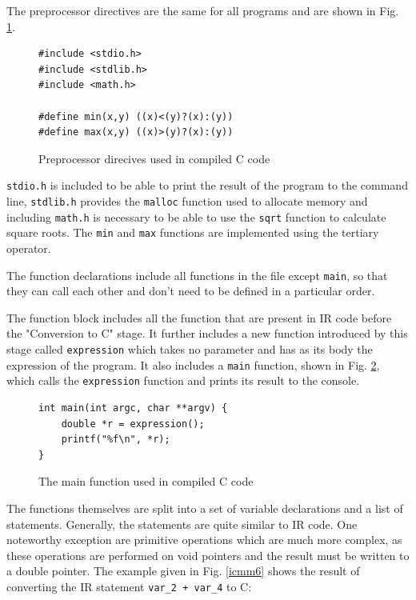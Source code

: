 \documentclass[11pt]{report}
\begin{document}
The preprocessor directives are the same for all programs and are shown in Fig. \ref{icmm4}.

\begin{figure}[ht]
\begin{lstlisting}
#include <stdio.h>
#include <stdlib.h>
#include <math.h>
    
#define min(x,y) ((x)<(y)?(x):(y))
#define max(x,y) ((x)>(y)?(x):(y))
\end{lstlisting}
\caption{Preprocessor direcives used in compiled C code}
\label{icmm4}
\end{figure}

\texttt{stdio.h} is included to be able to print the result of the program to the command line, \texttt{stdlib.h} provides the \texttt{malloc} function used to allocate memory and including \texttt{math.h} is necessary to be able to use the \texttt{sqrt} function to calculate square roots. The \texttt{min} and \texttt{max} functions are implemented using the tertiary operator.

The function declarations include all functions in the file except \texttt{main}, so that they can call each other and don't need to be defined in a particular order.

The function block includes all the function that are present in IR code before the "Conversion to C" stage. It further includes a new function introduced by this stage called \texttt{expression} which takes no parameter and has as its body the expression of the program. It also includes a \texttt{main} function, shown in Fig. \ref{icmm5}, which calls the \texttt{expression} function and prints its result to the console.

\begin{figure}[ht]
\begin{lstlisting}
int main(int argc, char **argv) {
    double *r = expression();
    printf("%f\n", *r);
}
\end{lstlisting}
\caption{The main function used in compiled C code}
\label{icmm5}
\end{figure}

The functions themselves are split into a set of variable declarations and a list of statements. Generally, the statements are quite similar to IR code. One noteworthy exception are primitive operations which are much more complex, as these operations are performed on void pointers and the result must be written to a double pointer. The example given in Fig. \ref{icmm6} shows the result of converting the IR statement \texttt{var_2 + var_4} to C:
\end{document}
